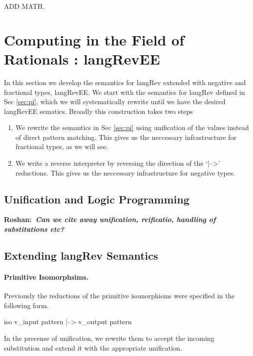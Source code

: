 \documentclass[preprint]{sigplanconf}
\newcommand{\xcomment}[2]{\textbf{#1:~\textsl{#2}}}
\newcommand{\roshan}[1]{\xcomment{Roshan}{#1}}
\begin{document}
ADD MATH. 

\section{Computing in the Field of Rationals : {{langRevEE}} }
\label{sec:rat}

In this section we develop the semantics for {{langRev}} extended with
negative and fractional types, {{langRevEE}}.  We start with the
semantics for {{langRev}} defined in Sec \ref{sec:pi}, which we will
systematically rewrite until we have the desired {{langRevEE}}
sematics. Broadly this construction takes two steps 

\begin{enumerate}
\item We rewrite the semantics in Sec \ref{sec:pi} using unification
  of the values instead of direct pattern matching. This gives us the
  neccessary infrastructure for fractional types, as we will see. 

\item We write a reverse interpreter by reversing the direction of the
  `{{|-->}}' reductions. This gives us the neccessary infrastructure for
  negative types.
\end{enumerate}


\subsection{Unification and Logic Programming}

\roshan{Can we cite away unification, reificatio, handling of
  substitutions etc?}

\subsection{Extending {{langRev}} Semantics}


\paragraph{Primitive Isomorphsims.}
Previously the reductions of the primitive isomorphisms were specified
in the following form.

{{ iso v_{input pattern} |--> v_{output pattern} }}

\noindent
In the precense of unification, we rewrite them to accept the incoming
substitution and extend it with the appropriate unification.
\end{document}
